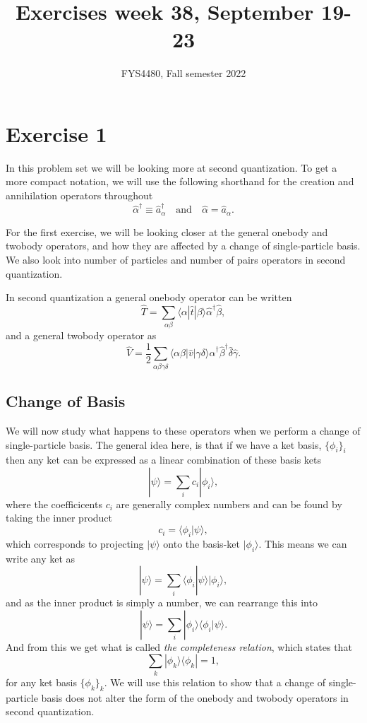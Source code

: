 \documentclass[a4paper, 11pt, notitlepage, english]{article}
\title{Exercises week 38, September 19-23}
\author{FYS4480, Fall semester 2022}
\newcommand{\bra}[1]{\langle #1|}
\newcommand{\ket}[1]{|#1 \rangle}
\newcommand{\braket}[2]{\langle #1 | #2 \rangle}
\newcommand{\op}[1]{\hat{#1}}
\newcommand{\braopket}[3]{\langle #1 | {#2} | #3 \rangle}
\newcommand{\ketbra}[2]{\ket{#1}\bra{#2}}
\begin{document}
\maketitle

\section*{Exercise 1}

In this problem set we will be looking more at second quantization. To get a more compact notation, we will use the following shorthand for the creation and annihilation operators throughout
$$\op{\alpha}^\dag \equiv \op{a}_\alpha^\dag \quad \mbox{and} \quad \op{\alpha} = \op{a}_\alpha.$$

For the first exercise, we will be looking closer at the general onebody and twobody operators, and how they are affected by a change of single-particle basis. We also look into number of particles and number of pairs operators in second quantization.

In second quantization a general onebody operator can be written
$$\op{T} = \sum_{\alpha\beta} \braopket{\alpha}{\op{t}}{\beta} \op{\alpha}^\dag \op{\beta},$$
and a general twobody operator as
$$\op{V} = \frac{1}{2}\sum_{\alpha\beta\gamma\delta} \braopket{\alpha\beta}{\op{v}}{\gamma\delta} \op{\alpha}^\dag \op{\beta}^\dag \op{\delta} \op{\gamma}.$$

\subsection*{Change of Basis}
We will now study what happens to these operators when we perform a change of single-particle basis. The general idea here, is that if we have a ket basis, $\{\phi_i\}_i$ then any ket can be expressed as a linear combination of these basis kets
$$\ket{\psi} = \sum_i c_i \ket{\phi_i},$$
where the coefficicents $c_i$ are generally complex numbers and can be found by taking the inner product 
$$c_i = \braket{\phi_i}{\psi},$$
which corresponds to projecting $\ket{\psi}$ onto the basis-ket $\ket{\phi_i}$. This means we can write any ket as
$$\ket{\psi} = \sum_i  \braket{\phi_i}{\psi}\ket{\phi_i},$$
and as the inner product is simply a number, we can rearrange this into
$$\ket{\psi} = \sum_i  \ket{\phi_i}\braket{\phi_i}{\psi}.$$
And from this we get what is called \emph{the completeness relation}, which states that 
$$\sum_k \ketbra{\phi_k}{\phi_k} = 1,$$
for any ket basis $\{\phi_k\}_k$. We will use this relation to show that a change of single-particle basis does not alter the form of the onebody and twobody operators in second quantization.
\end{document}
